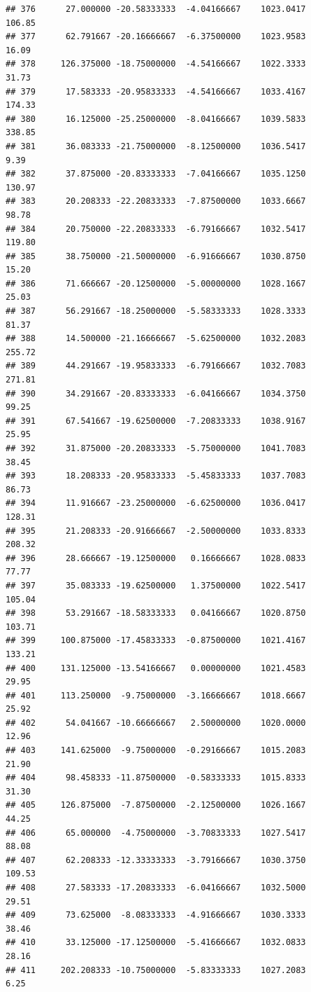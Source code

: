 \documentclass[
]{article}
\begin{document}
\begin{verbatim}
## 376      27.000000 -20.58333333  -4.04166667    1023.0417      106.85
## 377      62.791667 -20.16666667  -6.37500000    1023.9583       16.09
## 378     126.375000 -18.75000000  -4.54166667    1022.3333       31.73
## 379      17.583333 -20.95833333  -4.54166667    1033.4167      174.33
## 380      16.125000 -25.25000000  -8.04166667    1039.5833      338.85
## 381      36.083333 -21.75000000  -8.12500000    1036.5417        9.39
## 382      37.875000 -20.83333333  -7.04166667    1035.1250      130.97
## 383      20.208333 -22.20833333  -7.87500000    1033.6667       98.78
## 384      20.750000 -22.20833333  -6.79166667    1032.5417      119.80
## 385      38.750000 -21.50000000  -6.91666667    1030.8750       15.20
## 386      71.666667 -20.12500000  -5.00000000    1028.1667       25.03
## 387      56.291667 -18.25000000  -5.58333333    1028.3333       81.37
## 388      14.500000 -21.16666667  -5.62500000    1032.2083      255.72
## 389      44.291667 -19.95833333  -6.79166667    1032.7083      271.81
## 390      34.291667 -20.83333333  -6.04166667    1034.3750       99.25
## 391      67.541667 -19.62500000  -7.20833333    1038.9167       25.95
## 392      31.875000 -20.20833333  -5.75000000    1041.7083       38.45
## 393      18.208333 -20.95833333  -5.45833333    1037.7083       86.73
## 394      11.916667 -23.25000000  -6.62500000    1036.0417      128.31
## 395      21.208333 -20.91666667  -2.50000000    1033.8333      208.32
## 396      28.666667 -19.12500000   0.16666667    1028.0833       77.77
## 397      35.083333 -19.62500000   1.37500000    1022.5417      105.04
## 398      53.291667 -18.58333333   0.04166667    1020.8750      103.71
## 399     100.875000 -17.45833333  -0.87500000    1021.4167      133.21
## 400     131.125000 -13.54166667   0.00000000    1021.4583       29.95
## 401     113.250000  -9.75000000  -3.16666667    1018.6667       25.92
## 402      54.041667 -10.66666667   2.50000000    1020.0000       12.96
## 403     141.625000  -9.75000000  -0.29166667    1015.2083       21.90
## 404      98.458333 -11.87500000  -0.58333333    1015.8333       31.30
## 405     126.875000  -7.87500000  -2.12500000    1026.1667       44.25
## 406      65.000000  -4.75000000  -3.70833333    1027.5417       88.08
## 407      62.208333 -12.33333333  -3.79166667    1030.3750      109.53
## 408      27.583333 -17.20833333  -6.04166667    1032.5000       29.51
## 409      73.625000  -8.08333333  -4.91666667    1030.3333       38.46
## 410      33.125000 -17.12500000  -5.41666667    1032.0833       28.16
## 411     202.208333 -10.75000000  -5.83333333    1027.2083        6.25

\end{verbatim}
\end{document}

